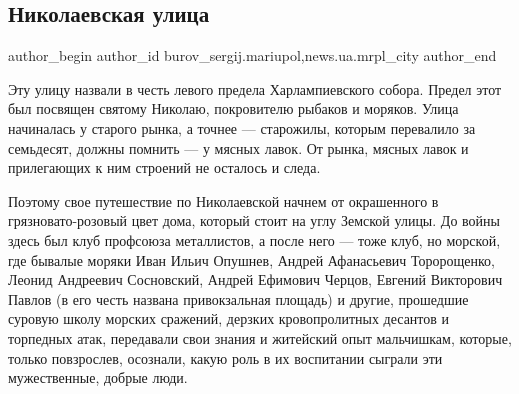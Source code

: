  
 
 
 
 
 
\subsection{Николаевская улица}
\label{sec:17_12_2017.stz.news.ua.mrpl_city.1.nikolaevskaja_ulica}
 
\ifcmt
 author_begin
   author_id burov_sergij.mariupol,news.ua.mrpl_city
 author_end
\fi

Эту улицу назвали в честь левого предела Харлампиевского собора. Предел этот
был посвящен святому Николаю, покровителю рыбаков и моряков. Улица начиналась у
старого рынка, а точнее — старожилы, которым перевалило за семьдесят,  должны
помнить — у мясных лавок. От рынка, мясных лавок и прилегающих к ним строений
не осталось и следа.


Поэтому свое путешествие по Николаевской начнем от окрашенного в
грязновато-розовый цвет дома, который  стоит на углу Земской улицы. До войны
здесь был клуб профсоюза металлистов, а после него — тоже клуб, но морской, где
бывалые моряки Иван Ильич Опушнев, Андрей Афанасьевич Торорощенко, Леонид
Андреевич Сосновский, Андрей Ефимович Черцов, Евгений Викторович Павлов (в его
честь названа привокзальная площадь) и другие, прошедшие суровую школу морских
сражений, дерзких кровопролитных десантов и торпедных атак, передавали свои
знания и житейский опыт мальчишкам, которые, только повзрослев, осознали, какую
роль в их воспитании сыграли эти мужественные, добрые люди.

